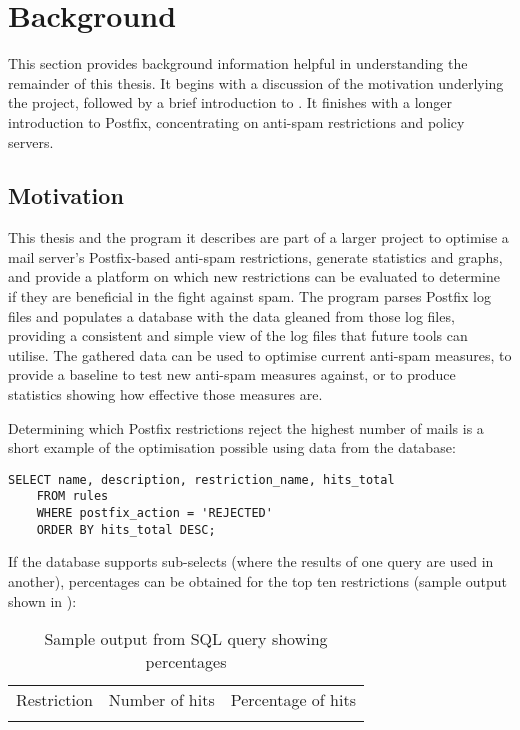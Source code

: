 \chapter{Background}

\label{background}

This section provides background information helpful in understanding the
remainder of this thesis.  It begins with a discussion of the motivation
underlying the project, followed by a brief introduction to
\@.  It finishes with a longer introduction to Postfix,
concentrating on anti-spam restrictions and policy servers.

\section{Motivation}

\label{motivation}

This thesis and the program it describes are part of a larger project to
optimise a mail server's Postfix-based anti-spam restrictions, generate
statistics and graphs, and provide a platform on which new restrictions can
be evaluated to determine if they are beneficial in the fight against spam.
The program parses Postfix log files and populates a database with the data
gleaned from those log files, providing a consistent and simple view of the
log files that future tools can utilise.  The gathered data can be used to
optimise current anti-spam measures, to provide a baseline to test new
anti-spam measures against, or to produce statistics showing how effective
those measures are.

Determining which Postfix restrictions reject the highest number of mails
is a short example of the optimisation possible using data from the
database:

\begin{verbatim}
SELECT name, description, restriction_name, hits_total
    FROM rules
    WHERE postfix_action = 'REJECTED'
    ORDER BY hits_total DESC;
\end{verbatim}

If the database supports sub-selects (where the results of one query are
used in another), percentages can be obtained for the top ten restrictions
(sample output shown in ):



\begin{table}[ht]
    \caption{Sample output from SQL query showing percentages}
    \empty{}\label{Sample output from SQL query showing
    percentages}
    \begin{tabular}[]{lrr}
        \tabletopline{}%
        Restriction & Number of hits & Percentage of hits \\
        \tablemiddleline{}%
        
        \tablebottomline{}%
    \end{tabular}
\end{table}



